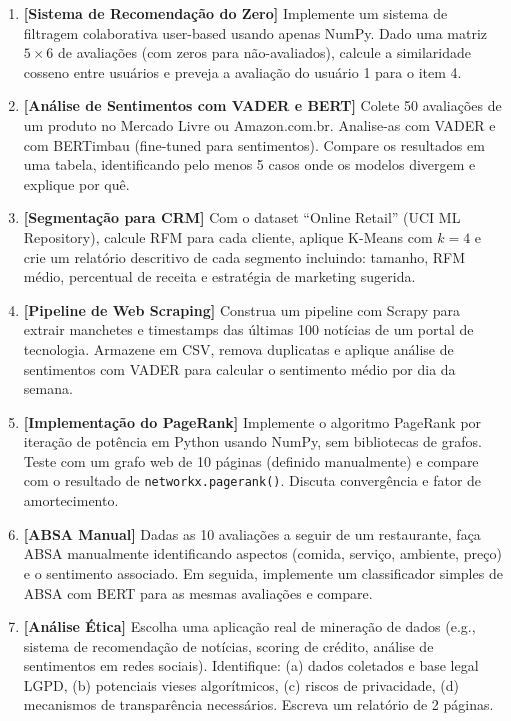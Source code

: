 \documentclass[12pt,a4paper]{article}
\begin{document}
\begin{enumerate}[label=\textbf{\arabic*.}, itemsep=0.5em]
  \item \textbf{[Sistema de Recomendação do Zero]} Implemente um sistema de filtragem colaborativa user-based usando apenas NumPy. Dado uma matriz $5 \times 6$ de avaliações (com zeros para não-avaliados), calcule a similaridade cosseno entre usuários e preveja a avaliação do usuário 1 para o item 4.

  \item \textbf{[Análise de Sentimentos com VADER e BERT]} Colete 50 avaliações de um produto no Mercado Livre ou Amazon.com.br. Analise-as com VADER e com BERTimbau (fine-tuned para sentimentos). Compare os resultados em uma tabela, identificando pelo menos 5 casos onde os modelos divergem e explique por quê.

  \item \textbf{[Segmentação para CRM]} Com o dataset ``Online Retail'' (UCI ML Repository), calcule RFM para cada cliente, aplique K-Means com $k=4$ e crie um relatório descritivo de cada segmento incluindo: tamanho, RFM médio, percentual de receita e estratégia de marketing sugerida.

  \item \textbf{[Pipeline de Web Scraping]} Construa um pipeline com Scrapy para extrair manchetes e timestamps das últimas 100 notícias de um portal de tecnologia. Armazene em CSV, remova duplicatas e aplique análise de sentimentos com VADER para calcular o sentimento médio por dia da semana.

  \item \textbf{[Implementação do PageRank]} Implemente o algoritmo PageRank por iteração de potência em Python usando NumPy, sem bibliotecas de grafos. Teste com um grafo web de 10 páginas (definido manualmente) e compare com o resultado de \texttt{networkx.pagerank()}. Discuta convergência e fator de amortecimento.

  \item \textbf{[ABSA Manual]} Dadas as 10 avaliações a seguir de um restaurante, faça ABSA manualmente identificando aspectos (comida, serviço, ambiente, preço) e o sentimento associado. Em seguida, implemente um classificador simples de ABSA com BERT para as mesmas avaliações e compare.

  \item \textbf{[Análise Ética]} Escolha uma aplicação real de mineração de dados (e.g., sistema de recomendação de notícias, scoring de crédito, análise de sentimentos em redes sociais). Identifique: (a) dados coletados e base legal LGPD, (b) potenciais vieses algorítmicos, (c) riscos de privacidade, (d) mecanismos de transparência necessários. Escreva um relatório de 2 páginas.
\end{enumerate}
\end{document}
